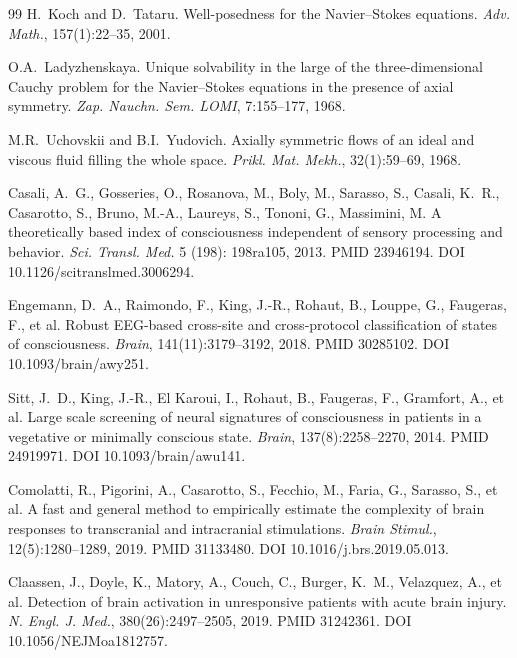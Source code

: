 \documentclass[11pt,a4paper]{amsart}
\theoremstyle{plain}
\theoremstyle{definition}
\begin{document}
\begin{thebibliography}{99}
H.~Koch and D.~Tataru.
\newblock Well-posedness for the Navier--Stokes equations.
\newblock \emph{Adv. Math.}, 157(1):22--35, 2001.

O.A.~Ladyzhenskaya.
\newblock Unique solvability in the large of the three-dimensional Cauchy problem for the Navier--Stokes equations in the presence of axial symmetry.
\newblock \emph{Zap. Nauchn. Sem. LOMI}, 7:155--177, 1968.

M.R.~Uchovskii and B.I.~Yudovich.
\newblock Axially symmetric flows of an ideal and viscous fluid filling the whole space.
\newblock \emph{Prikl. Mat. Mekh.}, 32(1):59--69, 1968.

Casali, A.~G., Gosseries, O., Rosanova, M., Boly, M., Sarasso, S., Casali, K.~R., Casarotto, S., Bruno, M.-A., Laureys, S., Tononi, G., Massimini, M.
\newblock A theoretically based index of consciousness independent of sensory processing and behavior.
\newblock \emph{Sci. Transl. Med.} 5 (198): 198ra105, 2013. PMID 23946194. DOI 10.1126/scitranslmed.3006294.

Engemann, D.~A., Raimondo, F., King, J.-R., Rohaut, B., Louppe, G., Faugeras, F., et al.
\newblock Robust EEG-based cross-site and cross-protocol classification of states of consciousness.
\newblock \emph{Brain}, 141(11):3179--3192, 2018. PMID 30285102. DOI 10.1093/brain/awy251.

Sitt, J.~D., King, J.-R., El Karoui, I., Rohaut, B., Faugeras, F., Gramfort, A., et al.
\newblock Large scale screening of neural signatures of consciousness in patients in a vegetative or minimally conscious state.
\newblock \emph{Brain}, 137(8):2258--2270, 2014. PMID 24919971. DOI 10.1093/brain/awu141.

Comolatti, R., Pigorini, A., Casarotto, S., Fecchio, M., Faria, G., Sarasso, S., et al.
\newblock A fast and general method to empirically estimate the complexity of brain responses to transcranial and intracranial stimulations.
\newblock \emph{Brain Stimul.}, 12(5):1280--1289, 2019. PMID 31133480. DOI 10.1016/j.brs.2019.05.013.

Claassen, J., Doyle, K., Matory, A., Couch, C., Burger, K.~M., Velazquez, A., et al.
\newblock Detection of brain activation in unresponsive patients with acute brain injury.
\newblock \emph{N. Engl. J. Med.}, 380(26):2497--2505, 2019. PMID 31242361. DOI 10.1056/NEJMoa1812757.


\end{thebibliography}
\end{document}
